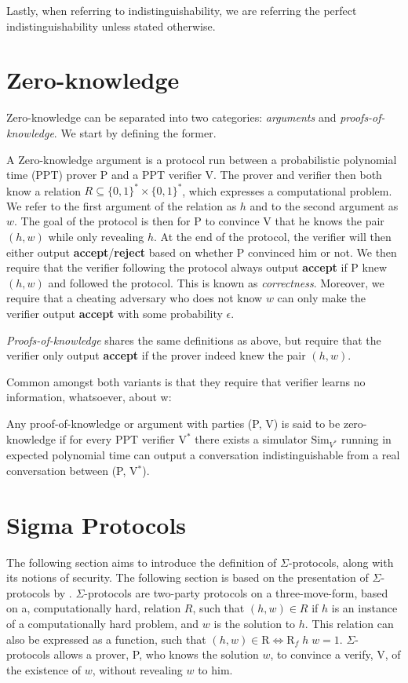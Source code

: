 Lastly, when referring to indistinguishability, we are referring the perfect
indistinguishability unless stated otherwise.

\section{Zero-knowledge}
\label{sec:background:zero-knowledge}
Zero-knowledge can be separated into two categories: \textit{arguments} and
\textit{proofs-of-knowledge}. We start by defining the former.

A Zero-knowledge argument is a protocol run between a probabilistic polynomial
time (PPT) prover P and a PPT verifier V. The prover and verifier then both
know a relation $R \subseteq \{0,1\}^{*} \times \{0,1\}^*$, which expresses a
computational problem. We refer to the first argument of the relation as $h$ and
to the second argument as $w$.
The goal of the protocol is then for P to convince V that he knows the pair
$(h,w)$ while only revealing $h$. At the end of the protocol, the verifier will
then either output \textbf{accept}/\textbf{reject} based on whether P convinced
him or not.
We then require that the verifier following the protocol always output
\textbf{accept} if P knew $(h,w)$ and followed the protocol. This is known as \textit{correctness}.
Moreover, we require that a cheating adversary who does not know $w$ can
only make the verifier output \textbf{accept} with some probability $\epsilon$.

\textit{Proofs-of-knowledge} shares the same definitions
as above, but require that the verifier only output \textbf{accept} if the
prover indeed knew the pair $(h,w)$.


Common amongst both variants is that they require that verifier learns no
information, whatsoever, about w:

\begin{definition}
  \label{def:zk}
  Any proof-of-knowledge or argument with parties (P, V) is said to be
  zero-knowledge if for every PPT verifier V$^{*}$ there exists a
  simulator $\text{Sim}_{V^{*}}$ running in expected polynomial time can output a
  conversation indistinguishable from a real conversation between (P, V$^{*}$).
\end{definition}


\section{Sigma Protocols}
\label{sec:background:sigma_protocols}
The following section aims to introduce the definition of $\Sigma$-protocols,
along with its notions of security. The following section is based on the
presentation of $\Sigma$-protocols by \citet{on-sigma-protocols}.
$\Sigma$-protocols are two-party protocols on a three-move-form, based on a,
computationally hard, relation $R$, such that $(h, w) \in R$ if $h$ is an
instance of a computationally hard problem, and $w$ is the solution to $h$.
This relation can also be expressed as a function, such that
$(h,w) \in \text{R} \iff \text{R}_{f} \; h \; w = 1$.
$\Sigma$-protocols allows a prover, P, who knows the solution $w$, to convince a
verify, V, of the existence of $w$, without revealing $w$ to him.


